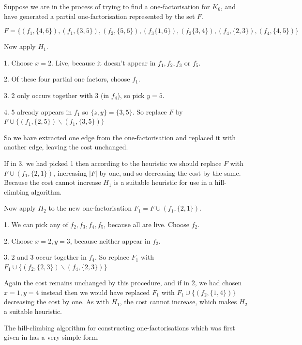 \documentclass[
  11pt,
  a4paper]{book}\usepackage[]{graphicx}\usepackage[]{xcolor}
\begin{document}
Suppose we are in the process of trying to find a
one-factorisation for $K_6$, and have generated a partial
one-factorisation represented by the set $F$.

\begin{equation*}
F = \{(f_1,\{4,6\}),(f_1,\{3,5\}),(f_2,\{5,6\}),(f_3\{1,6\}), (f_3\{3,4\}),(f_4,\{2,3\}),(f_4,\{4,5\})\}
\end{equation*}

Now apply $H_1$.

  1. Choose $x = 2$. Live, because it doesn’t appear in
     $f_1, f_2, f_3$ or $f_5$.

  2. Of these four partial one factors, choose $f_1$.

  3. 2 only occurs together with 3 (in $f_4$),
     so pick $y = 5$.

  4. 5 already appears in $f_1$ so $\{z, y\} = \{3, 5\}$.
     So replace $F$ by
     $F \cup \{(f_1, \{2, 5\}) \backslash (f_1, \{3, 5\})\}$

So we have extracted one edge from the one-factorisation and
replaced it with another edge, leaving the cost unchanged.

If in 3. we had picked 1 then according to the heuristic we
should replace $F$ with $F \cup (f_1, \{2, 1\})$, increasing
$|F|$ by one, and so decreasing the cost by the same. Because
the cost cannot increase $H_1$ is a suitable heuristic for use
in a hill-climbing algorithm.

Now apply $H_2$ to the new one-factorisation
$F_1 = F \cup (f_1, \{2, 1\})$.

  1. We can pick any of $f_2, f_3, f_4, f_5$,
     because all are live. Choose $f_2$.

  2. Choose $x = 2, y = 3$,
     because neither appear in $f_2$.

  3. 2 and 3 occur together in $f_4$. So replace $F_1$
     with
     $F_1 \cup \{(f_2, \{2, 3\}) \backslash (f_4, \{2, 3\})\}$

Again the cost remains unchanged by this procedure,
and if in 2, we had chosen $x = 1, y = 4$ instead then
we would have replaced $F_1$ with
$F_1 \cup \{(f_2, \{1, 4\})\}$
decreasing the cost by one. As with $H_1$,
the cost cannot increase, which makes $H_2$ a suitable
heuristic.

The hill-climbing algorithm for constructing one-factorisations
which was first given in
\cite{dinitzHillClimbingAlgorithmConstruction1987}
has a very simple form.

\begin{algorithm}[H]
\end{algorithm}
\end{document}
